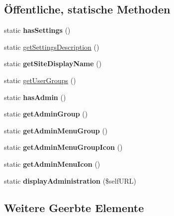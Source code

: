 \subsection*{Öffentliche, statische Methoden}
\begin{DoxyCompactItemize}
\item 
\mbox{\label{classklassenlisten_aa73c9188f6fcba75f61697f071bd66d5}} 
static {\bfseries has\+Settings} ()
\item 
static \mbox{\hyperlink{classklassenlisten_a37fa2fa96f99eb524cc36894bfe2484c}{get\+Settings\+Description}} ()
\item 
\mbox{\label{classklassenlisten_a9719dc072202f87c362f7cfb26a01a2e}} 
static {\bfseries get\+Site\+Display\+Name} ()
\item 
static \mbox{\hyperlink{classklassenlisten_a837f93ce360f26c279734d32b93b9407}{get\+User\+Groups}} ()
\item 
\mbox{\label{classklassenlisten_ae68f47a76928c01a67b729f7c11a3969}} 
static {\bfseries has\+Admin} ()
\item 
\mbox{\label{classklassenlisten_acf668c27dc08b28c07391534c2142178}} 
static {\bfseries get\+Admin\+Group} ()
\item 
\mbox{\label{classklassenlisten_acea79a7a79247b0d3e9684d2eb35e961}} 
static {\bfseries get\+Admin\+Menu\+Group} ()
\item 
\mbox{\label{classklassenlisten_ade499f85539de821ba8eb6db861f6a6b}} 
static {\bfseries get\+Admin\+Menu\+Group\+Icon} ()
\item 
\mbox{\label{classklassenlisten_a48b7f5ff1296a754391f49105ddbdeeb}} 
static {\bfseries get\+Admin\+Menu\+Icon} ()
\item 
\mbox{\label{classklassenlisten_a889dbd52dceb355541dbec3616fc2b3b}} 
static {\bfseries display\+Administration} (\$self\+U\+RL)
\end{DoxyCompactItemize}
\subsection*{Weitere Geerbte Elemente}


